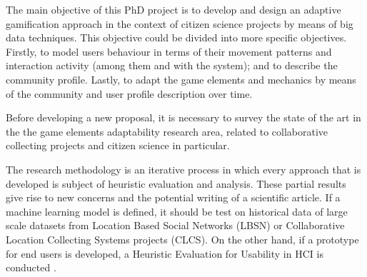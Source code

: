 \documentclass[sigconf]{acmart}
\begin{document}
The main objective of this PhD project is to develop and design an adaptive gamification approach in the context of citizen science projects by means of big data techniques. This objective could be divided into more specific objectives. Firstly, to model users behaviour in terms of their movement patterns and interaction activity (among them and with the system); and  to describe the community profile. Lastly, to adapt the game elements and mechanics by means of the community and user profile description over time.



Before developing a new proposal, it is necessary to survey the state of the art in the the game elements adaptability research area, related to collaborative collecting projects and citizen science in particular.



The research methodology is an iterative process in which every approach that is developed is subject of heuristic evaluation and analysis. These partial results give rise to new concerns and the potential writing of a scientific article.
If a machine learning model is defined, it should be test on historical data of large scale datasets from Location Based Social Networks (LBSN) or Collaborative Location Collecting Systems projects (CLCS). On the other hand, if a prototype for end users is developed, a Heuristic Evaluation for Usability in HCI is conducted \cite{Nielsen1990}.




\end{document}

